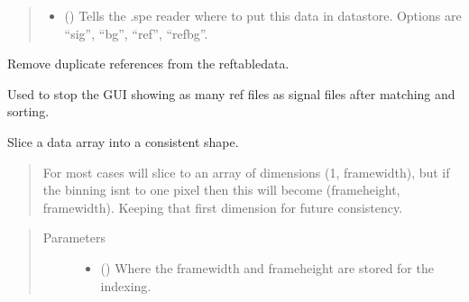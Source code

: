 \documentclass[a4paper,10pt,english]{sphinxmanual}
\begin{document}
\begin{fulllineitems}
\begin{fulllineitems}
\begin{quote}
\begin{description}
\begin{itemize}
\item {} 
\sphinxAtStartPar
{} () \textendash{} Tells the .spe reader where to put this data in datastore. Options are “sig”, “bg”, “ref”,
“refbg”.

\end{itemize}

\end{description}\end{quote}

\end{fulllineitems}


\begin{fulllineitems}
\label{\detokenize{sfgtools:sfgtools.SFGProcessTools.remove_duplicate_refs}}
\sphinxAtStartPar
Remove duplicate references from the reftabledata.

\sphinxAtStartPar
Used to stop the GUI showing as many ref files as signal files after matching and sorting.

\end{fulllineitems}


\begin{fulllineitems}
\label{\detokenize{sfgtools:sfgtools.SFGProcessTools.slice_data}}
\sphinxAtStartPar
Slice a data array into a consistent shape.
\begin{quote}

\sphinxAtStartPar
For most cases will slice to an array of dimensions (1, framewidth), but if the binning isnt to
one pixel then this will become (frameheight, framewidth). Keeping that first dimension for future
consistency.
\end{quote}
\begin{quote}\begin{description}
\item[{Parameters}] \leavevmode\begin{itemize}
\item {} 
\sphinxAtStartPar
{} () \textendash{} Where the framewidth and frameheight are stored for the indexing.


\end{itemize}
\end{description}
\end{quote}
\end{fulllineitems}
\end{fulllineitems}
\end{document}

